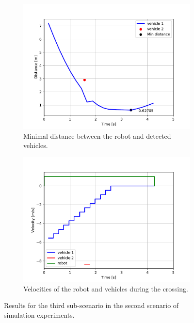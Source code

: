             \begin{figure}[H]
                \centering
                \begin{subfigure}{0.49\linewidth}
                    \centering
                    \includegraphics[trim={24 8 40 41}, clip, width=\linewidth]{images/simulations/scene2_3_dist.pdf}
                    \caption{Minimal distance between the robot and detected vehicles.}
                \end{subfigure}
                \begin{subfigure}{0.49\linewidth}
                    \centering
                    \includegraphics[trim={21 8 40 41}, clip, width=\linewidth]{images/simulations/scene2_3_vel.pdf}
                    \caption{Velocities of the robot and vehicles during the crossing.}
                \end{subfigure}
                \caption{Results for the third sub-scenario in the second scenario of simulation experiments.}
                \label{fig:scene2_3_graphs}
            \end{figure}
